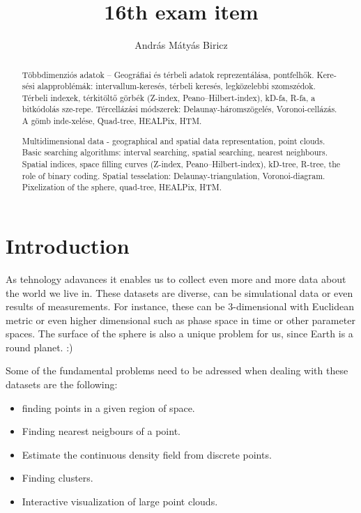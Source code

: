 \documentclass[12pt]{article}
\theoremstyle{plain}
\begin{document}
\title{16th exam item}
\author{András Mátyás Biricz}

\maketitle


\newpage
\begin{abstract}
    Többdimenziós adatok – Geográfiai és térbeli adatok reprezentálása, pontfelhők. Kere-sési alapproblémák: intervallum-keresés, térbeli keresés, legközelebbi szomszédok. Térbeli indexek, térkitöltő görbék (Z-index, Peano–Hilbert-index), kD-fa, R-fa, a bitkódolás sze-repe. Tércellázási módszerek: Delaunay-háromszögelés, Voronoi-cellázás. A gömb inde-xelése, Quad-tree, HEALPix, HTM.
    
    Multidimensional data - geographical and spatial data representation, point clouds. Basic searching algorithms: interval searching, spatial searching, nearest neighbours. Spatial indices, space filling curves (Z-index, Peano–Hilbert-index), kD-tree, R-tree, the role of binary coding. Spatial tesselation: Delaunay-triangulation, Voronoi-diagram. Pixelization of the sphere, quad-tree, HEALPix, HTM.
\end{abstract}


\section{Introduction}

As tehnology adavances it enables us to collect even more and more data about the world we live in. These datasets are diverse, can be simulational data or even results of measurements. For instance, these can be 3-dimensional with Euclidean metric or even higher dimensional such as phase space in time or other parameter spaces. The surface of the sphere is also a unique problem for us, since Earth is a round planet. :)

Some of the fundamental problems need to be adressed when dealing with these datasets are the following: 

\begin{itemize}
	\item finding points in a given region of space.
	\item Finding nearest neigbours of a point.
	\item Estimate the continuous density field from discrete points.
	\item Finding clusters.
	\item Interactive visualization of large point clouds.
\end{itemize}
\end{document}
